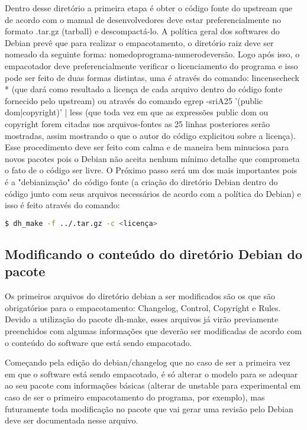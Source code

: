 Dentro desse diretório a primeira etapa é obter o código fonte do upstream que de acordo com o manual de desenvolvedores deve estar preferencialmente no formato .tar.gz (tarball) e descompactá-lo. A política geral dos softwares do Debian prevê que para realizar o empacotamento, o diretório raiz deve ser nomeado da seguinte forma: nomedoprograma-numerodeversão. Logo após isso, o empacotador deve preferencialmente verificar o licenciamento do programa e isso pode ser feito de duas formas distintas, uma é através do comando: lincensecheck * (que dará como resultado a licença de cada arquivo dentro do código fonte fornecido pelo upstream) ou através do comando egrep -sriA25 '(public dom|copyright)' | less (que toda vez em que as expressões public dom ou copyright forem citadas nos arquivos-fontes as 25 linhas posteriores serão mostradas, assim mostrando o que o autor do código explicitou sobre a licença). Esse procedimento deve ser feito com calma e de maneira bem minuciosa para novos pacotes pois o Debian não aceita nenhum mínimo detalhe que comprometa o fato de o código ser livre.
O Próximo passo será um dos mais importantes pois é a "debianização" do código fonte (a criação do diretório Debian dentro do código junto com seus arquivos necessários de acordo com a política do Debian) e isso é feito através do comando:

\begin{lstlisting}[language=bash]
	$ dh_make -f ../.tar.gz -c <licença> 
\end{lstlisting} 

\subsection{Modificando o conteúdo do diretório Debian do pacote}

Os primeiros arquivos do diretório debian a ser modificados são os que são obrigatórios para o empacotamento: Changelog, Control, Copyright e Rules. Devido a utilização do pacote dh-make, esses arquivos já virão previamente preenchidos com algumas informações que deverão ser modificadas de acordo com o conteúdo do software que está sendo empacotado.

Começando pela edição do debian/changelog que no caso de ser a primeira vez em que o software está sendo empacotado, é só alterar o modelo para se adequar ao seu pacote com informações básicas (alterar de unstable para experimental em caso de ser o primeiro empacotamento do programa, por exemplo), mas futuramente toda modificação no pacote que vai gerar uma revisão pelo Debian deve ser documentada nesse arquivo. 

